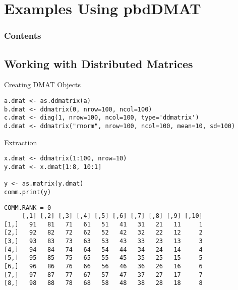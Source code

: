\section[pbdDMAT eg's]{Examples Using pbdDMAT}
\setcounter{excount}{0}


\hidenum
\begin{frame}[noframenumbering]
\frametitle{Contents}
 \tableofcontents[currentsection,hideothersubsections,sectionstyle=show/hide]
\end{frame}
\shownum



\subsection{Working with Distributed Matrices}


\begin{frame}[fragile]
  \begin{exampleblock}{Creating DMAT Objects}\pause
\begin{lstlisting}
a.dmat <- as.ddmatrix(a)
b.dmat <- ddmatrix(0, nrow=100, ncol=100)
c.dmat <- diag(1, nrow=100, ncol=100, type='ddmatrix')
d.dmat <- ddmatrix("rnorm", nrow=100, ncol=100, mean=10, sd=100)
\end{lstlisting}
  \end{exampleblock}
\end{frame}


\begin{frame}[fragile]
  \begin{exampleblock}{Extraction}\pause
\begin{lstlisting}
x.dmat <- ddmatrix(1:100, nrow=10)
y.dmat <- x.dmat[1:8, 10:1]

y <- as.matrix(y.dmat)
comm.print(y)
\end{lstlisting}

\begin{lstlisting}[backgroundcolor=\color{white},basicstyle=\ttfamily\color{dkgray}\scriptsize,keywordstyle=\color{black},commentstyle=\color{orange},stringstyle=\color{mauve}]
COMM.RANK = 0
     [,1] [,2] [,3] [,4] [,5] [,6] [,7] [,8] [,9] [,10]
[1,]   91   81   71   61   51   41   31   21   11     1
[2,]   92   82   72   62   52   42   32   22   12     2
[3,]   93   83   73   63   53   43   33   23   13     3
[4,]   94   84   74   64   54   44   34   24   14     4
[5,]   95   85   75   65   55   45   35   25   15     5
[6,]   96   86   76   66   56   46   36   26   16     6
[7,]   97   87   77   67   57   47   37   27   17     7
[8,]   98   88   78   68   58   48   38   28   18     8
\end{lstlisting}
  \end{exampleblock}
\end{frame}


